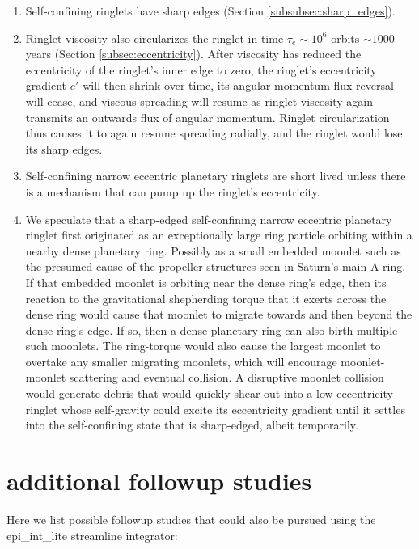 \documentclass[preprint]{aastex62}
\begin{document}
\begin{enumerate}
\item Self-confining ringlets have sharp edges (Section \ref{subsubsec:sharp_edges}).

\item Ringlet viscosity also circularizes the ringlet in time $\tau_e\sim10^6$ orbits $\sim1000$ years
(Section \ref{subsec:eccentricity}). After viscosity has reduced the eccentricity of the ringlet's 
inner edge to zero, the ringlet's  eccentricity gradient $e'$ will then shrink over time, its
angular momentum flux reversal will cease, and viscous spreading will resume as ringlet 
viscosity again transmits an  outwards flux of angular momentum. Ringlet circularization thus causes 
it to again resume spreading radially, and the ringlet would lose its sharp edges.

\item Self-confining narrow eccentric planetary ringlets are short lived unless there is a mechanism
that can pump up the ringlet's eccentricity.

\item We speculate that a sharp-edged self-confining narrow eccentric planetary ringlet first originated as
an exceptionally large ring particle orbiting within a nearby dense planetary ring. 
Possibly as a small embedded moonlet such as the presumed cause of the propeller structures
seen in Saturn's main A ring. If that embedded moonlet is orbiting near the dense ring's edge, then
its reaction to the gravitational shepherding torque that it exerts across the dense ring would
cause that moonlet to migrate towards and then beyond the dense ring's edge. If so, then 
a dense planetary ring can also birth multiple such moonlets. The ring-torque would also 
cause the largest moonlet to overtake any smaller migrating moonlets, which will encourage
moonlet-moonlet scattering and eventual collision. A disruptive moonlet collision
would generate debris that would quickly
shear out into a low-eccentricity ringlet whose self-gravity could excite its eccentricity gradient
until it settles into the self-confining state that is sharp-edged, albeit temporarily. 

\end{enumerate}


\section{additional followup studies}
\label{sec:followup}

Here we list possible followup studies that could also be pursued using the epi\_int\_lite streamline integrator:
\end{document}
